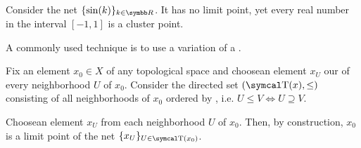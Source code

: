 \begin{Example}\label{ex:cluster_points/sine}
  Consider the net \( \{ \sin(k) \}_{k \in \BR} \). It has no limit point, yet every real number in the interval \( [-1, 1] \) is a cluster point.
\end{Example}

\begin{Example}\label{ex:reverse_inclusion_net}
  A commonly used technique is to use a variation of a .

  Fix an element \( x_0 \in X \) of any topological space and choose\LEM an element \( x_U \) our of every neighborhood \( U \) of \( x_0 \). Consider the directed set \( (\CT(x), \leq) \) consisting of all neighborhoods of \( x_0 \) ordered by , i.e. \( U \leq V \iff U \supseteq V \).

  Choose\LEM an element \( x_U \) from each neighborhood \( U \) of \( x_0 \). Then, by construction, \( x_0 \) is a limit point of the net \( \{ x_U \}_{U \in \CT(x_0)} \).
\end{Example}


